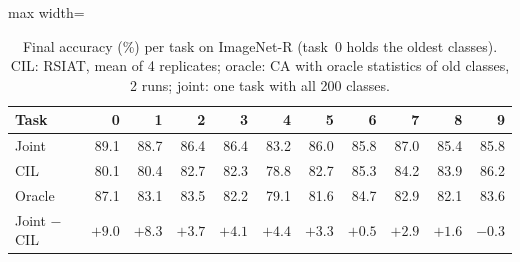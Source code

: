 \begin{table}[t]
\centering
\caption{Final accuracy (\%) per task on ImageNet-R (task~0 holds the oldest
classes). CIL: RSIAT, mean of 4 replicates; oracle: CA with oracle statistics
of old classes, 2 runs; joint: one task with all 200 classes.}
\label{tab:gap}
\setlength{\tabcolsep}{4pt}
\begin{adjustbox}{max width=\textwidth}
\begin{tabular}{lrrrrrrrrrr}
\toprule
Task & 0 & 1 & 2 & 3 & 4 & 5 & 6 & 7 & 8 & 9\\
\midrule
Joint  & 89.1 & 88.7 & 86.4 & 86.4 & 83.2 & 86.0 & 85.8 & 87.0 & 85.4 & 85.8\\
CIL    & 80.1 & 80.4 & 82.7 & 82.3 & 78.8 & 82.7 & 85.3 & 84.2 & 83.9 & 86.2\\
Oracle & 87.1 & 83.1 & 83.5 & 82.2 & 79.1 & 81.6 & 84.7 & 82.9 & 82.1 & 83.6\\
\midrule
Joint $-$ CIL & $+9.0$ & $+8.3$ & $+3.7$ & $+4.1$ & $+4.4$ & $+3.3$ & $+0.5$ & $+2.9$ & $+1.6$ & $-0.3$\\
\bottomrule
\end{tabular}
\end{adjustbox}
\end{table}

